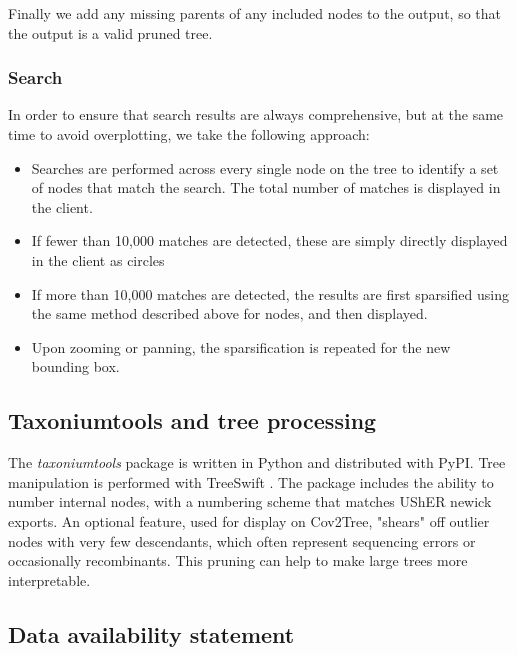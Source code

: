\documentclass[twocolumn]{bioRxiv}
\providecommand{\DIFadd}[1]{{\protect\color{teal}#1}}
\providecommand{\DIFaddend}{}
\begin{document}
\DIFadd{Finally we add any missing parents of any included nodes to the output, so that the output is a valid pruned tree.
}

\subsubsection*{\DIFadd{Search}}

\DIFadd{In order to ensure that search results are always comprehensive, but at the same time to avoid overplotting, we take the following approach:
}

\begin{itemize}

\item \DIFadd{Searches are performed across every single node on the tree to identify a set of nodes that match the search. The total number of matches is displayed in the client.
}\item \DIFadd{If fewer than 10,000 matches are detected, these are simply directly displayed in the client as circles
}\item \DIFadd{If more than 10,000 matches are detected, the results are first sparsified using the same method described above for nodes, and then displayed. 
}\item \DIFadd{Upon zooming or panning, the sparsification is repeated for the new bounding box.
}\end{itemize}
\DIFaddend 



\subsection*{Taxoniumtools and tree processing}
The \emph{taxoniumtools} package is written in Python and distributed with PyPI. Tree manipulation is performed with TreeSwift \citep{moshiri2020treeswift}. The package includes the ability to number internal nodes, with a numbering scheme that matches UShER newick exports. An optional feature, used for display on Cov2Tree, "shears" off outlier nodes with very few descendants, which often represent sequencing errors or occasionally recombinants. This pruning can help to make large trees more interpretable.


\small

\subsection*{Data availability statement}
\end{document}
